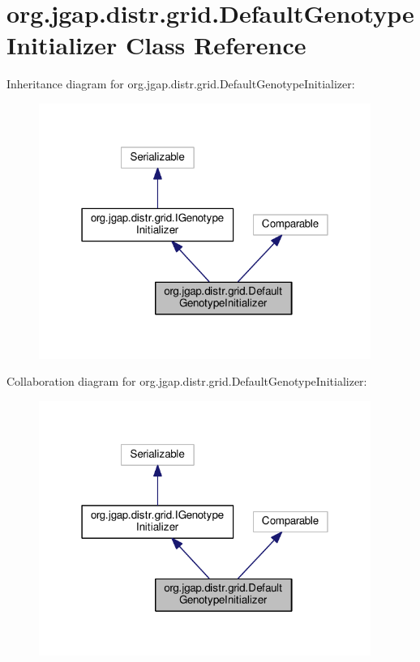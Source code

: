 \hypertarget{classorg_1_1jgap_1_1distr_1_1grid_1_1_default_genotype_initializer}{\section{org.\-jgap.\-distr.\-grid.\-Default\-Genotype\-Initializer Class Reference}
\label{classorg_1_1jgap_1_1distr_1_1grid_1_1_default_genotype_initializer}
}


Inheritance diagram for org.\-jgap.\-distr.\-grid.\-Default\-Genotype\-Initializer\-:
\nopagebreak
\begin{figure}[H]
\begin{center}
\leavevmode
\includegraphics[width=307pt]{classorg_1_1jgap_1_1distr_1_1grid_1_1_default_genotype_initializer__inherit__graph}
\end{center}
\end{figure}


Collaboration diagram for org.\-jgap.\-distr.\-grid.\-Default\-Genotype\-Initializer\-:
\nopagebreak
\begin{figure}[H]
\begin{center}
\leavevmode
\includegraphics[width=307pt]{classorg_1_1jgap_1_1distr_1_1grid_1_1_default_genotype_initializer__coll__graph}
\end{center}
\end{figure}
